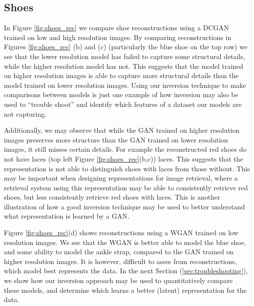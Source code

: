 \documentclass[journal]{IEEEtran}
\begin{document}
\subsection{Shoes}
\label{rec:shoes_rec}
In Figure \ref{fig:shoes_rec} we compare shoe reconstructions using a DCGAN trained on low and high resolution images. By comparing reconstructions in Figures \ref{fig:shoes_rec} (b) and (c) (particularly the blue shoe on the top row) we see that the lower resolution model has failed to capture some structural details, while the higher resolution model has not. This suggests that the model trained on higher resolution images is able to capture more structural details than the model trained on lower resolution images. Using our inversion technique to make comparisons between models is just one example of how inversion may also be used to ``trouble shoot'' and identify which features of a dataset our models are not capturing.

Additionally, we may observe that while the GAN trained on higher resolution images preserves more structure than the GAN trained on lower resolution images, it still misses certain details. For example the reconstructed red shoes do not have laces (top left Figure \ref{fig:shoes_rec}(b,c)) laces. This suggests that the representation is not able to distinguish shoes with laces from those without. This may be important when designing representations for image retrieval, where a retrieval system using this representation may be able to consistently retrieve red shoes, but less consistently retrieve red shoes with laces. This is another illustration of how a good inversion technique may be used to better understand what representation is learned by a GAN.

Figure \ref{fig:shoes_rec}(d) shows reconstructions using a WGAN trained on low resolution images. We see that the WGAN is better able to model the blue shoe, and some ability to model the ankle strap, compared to the GAN trained on higher resolution images. It is however, difficult to asses from reconstructions, which model best represents the data. In the next Section (\ref{sec:troubleshooting}), we show how our inversion approach may be used to quantitatively compare these models, and determine which learns a better (latent) representation for the data.
\end{document}

